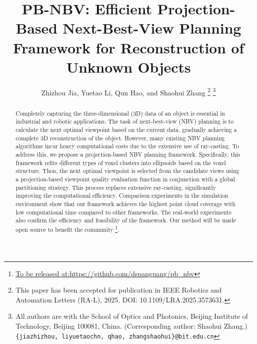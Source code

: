 \documentclass[letterpaper, 10 pt, conference]{ieeeconf}  %
\title{\LARGE \bf
    PB-NBV: Efficient Projection-Based Next-Best-View Planning Framework for Reconstruction of Unknown Objects
}
\author{Zhizhou Jia, Yuetao Li, Qun Hao, and Shaohui Zhang %
\thanks{
This paper has been accepted for publication in IEEE Robotics and Automation Letters (RA-L), 2025.
DOI: 10.1109/LRA.2025.3573631.}
\thanks{All authors are with the School of Optics and Photonics, Beijing Institute of Technology, Beijing 100081, China. (Corresponding author: Shaohui Zhang.)
        {\tt\small \{jiazhizhou, liyuetaochn, qhao, zhangshaohui\}@bit.edu.cn}}%
}
\begin{document}
\maketitle
\thispagestyle{empty}
\pagestyle{empty}

\begin{abstract}
Completely capturing the three-dimensional (3D) data of an object is essential in industrial and robotic applications.
The task of next-best-view (NBV) planning is to calculate the next optimal viewpoint based on the current data, gradually achieving a complete 3D reconstruction of the object.
However, many existing NBV planning algorithms incur heavy computational costs due to the extensive use of ray-casting.
To address this, we propose a projection-based NBV planning framework. 
Specifically, this framework refits different types of voxel clusters into ellipsoids based on the voxel structure.
Then, the next optimal viewpoint is selected from the candidate views using a projection-based viewpoint quality evaluation function in conjunction with a global partitioning strategy.
This process replaces extensive ray-casting, significantly improving the computational efficiency.
Comparison experiments in the simulation environment show that our framework achieves the highest point cloud coverage with low computational time compared to other frameworks.
The real-world experiments also confirm the efficiency and feasibility of the framework.
Our method will be made open source to benefit the community \footnote{ \href{https://github.com/dspangpang/pb\_nbv}{To be released at:https://github.com/dspangpang/pb\_nbv}}.
\end{abstract}


\end{document}

